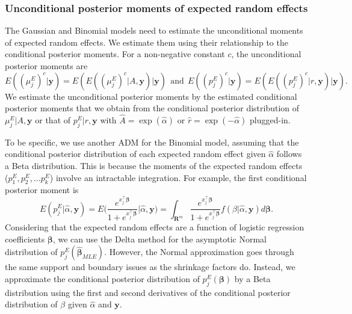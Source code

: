 \documentclass[article]{jss}
\begin{document}
\subsubsection{Unconditional posterior moments of expected random effects}
The Gaussian and Binomial models need to estimate the unconditional moments of expected random effects. We estimate them using their relationship to the conditional posterior moments. For a non-negative constant $c$, the unconditional posterior moments are
\begin{equation}
E((\mu^E_j)^c\vert\boldsymbol{y})=E(E((\mu^E_j)^c\vert A, \boldsymbol{y})\vert\boldsymbol{y})~~\textrm{and}~~E((p^E_j)^c\vert\boldsymbol{y})=E(E((p^E_j)^c\vert r, \boldsymbol{y})\vert\boldsymbol{y}).
\end{equation}
We estimate the unconditional posterior moments by the estimated conditional posterior moments that we obtain from the conditional posterior distribution of $\mu^E_j\vert A, \boldsymbol{y}$ or that of $p^E_j\vert r, \boldsymbol{y}$ with $\hat{A}=\exp(\hat{\alpha})$ or $\hat{r}=\exp(-\hat{\alpha})$ plugged-in.

To be specific, we use another ADM for the Binomial model, assuming that the conditional posterior distribution of each expected random effect given $\hat{\alpha}$ follows a Beta distribution. This is because the moments of the expected random effects ($p^E_{1}, p^E_{2}, \ldots p^E_{k}$) involve an intractable integration.  For example, the first conditional posterior moment is
\begin{equation}\label{priormoment1}
E(p^E_{j}\vert\hat{\alpha}, \boldsymbol{y})=E\bigg(\frac{e^{x_j^\top\boldsymbol{\beta}}}{1+e^{x_j^\top\boldsymbol{\beta}}}\bigg\vert\hat{\alpha}, \boldsymbol{y}\bigg)=\int_{\mathbf{R}^{m}} \frac{e^{x_j^\top\boldsymbol{\beta}}}{1+e^{x_j^\top\boldsymbol{\beta}}}f(\beta\vert\hat{\alpha}, \boldsymbol{y})d\boldsymbol{\beta}.
\end{equation}
Considering that the expected random effects are a function of logistic regression coefficients $\boldsymbol{\beta}$, we can use the Delta method for the asymptotic Normal distribution of $p^E_{j}(\hat{\boldsymbol{\beta}}_{MLE})$. However, the Normal approximation goes through the same support and boundary issues as the shrinkage factors do. Instead, we approximate the conditional posterior distribution of $p^E_{j}(\boldsymbol{\beta})$ by a Beta distribution using the first and second derivatives of the conditional posterior distribution of $\beta$ given $\hat{\alpha}$ and $\boldsymbol{y}$.
\end{document}
